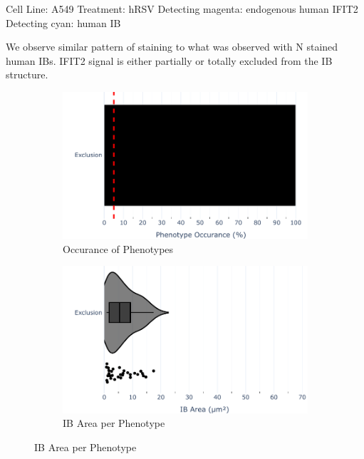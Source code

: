 Cell Line: A549 \newline
Treatment: hRSV \newline
Detecting magenta: endogenous human IFIT2  \newline
Detecting cyan: human IB  \newline

We observe similar pattern of staining to what was observed with N stained human IBs. IFIT2 signal is either partially or totally excluded from the IB structure.

\begin{figure}
    \begin{subfigure}{0.5\textwidth}
        \includegraphics[width=1\linewidth]{10. Chapter 5/Figs/01. Infection/02. IFIT2B/07. bar_i2b_a549-m21.pdf} 
        \caption[]{Occurance of Phenotypes}
    \end{subfigure}
    \begin{subfigure}{0.5\textwidth}
        \includegraphics[width=1\linewidth]{10. Chapter 5/Figs/01. Infection/02. IFIT2B/08. violin_i2b_a549-m21.pdf}
        \caption[]{IB Area per Phenotype}
    \end{subfigure}


\end{figure}
